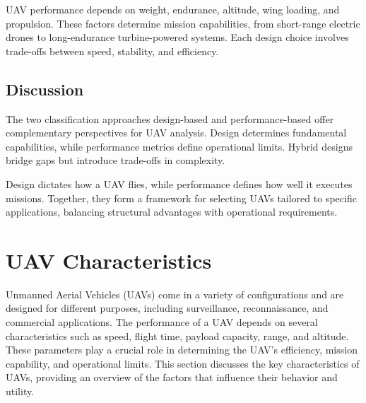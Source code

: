UAV performance depends on weight, endurance, altitude, wing loading, and propulsion. These factors determine mission capabilities, from short-range electric drones to long-endurance turbine-powered systems. Each design choice involves trade-offs between speed, stability, and efficiency.



\subsection{Discussion}

The two classification approaches design-based  and performance-based offer complementary perspectives for UAV analysis. Design determines fundamental capabilities, while performance metrics define operational limits. Hybrid designs bridge gaps but introduce trade-offs in complexity.

\vspace{0.5cm}

Design dictates how a UAV flies, while performance defines how well it executes missions. Together, they form a framework for selecting UAVs tailored to specific applications, balancing structural advantages with operational requirements.

\subsubsection{}




\section{UAV Characteristics}

Unmanned Aerial Vehicles (UAVs) come in a variety of configurations and are designed for different purposes, including surveillance, reconnaissance, and commercial applications. The performance of a UAV depends on several characteristics such as speed, flight time, payload capacity, range, and altitude. These parameters play a crucial role in determining the UAV's efficiency, mission capability, and operational limits. This section discusses the key characteristics of UAVs, providing an overview of the factors that influence their behavior and utility.


